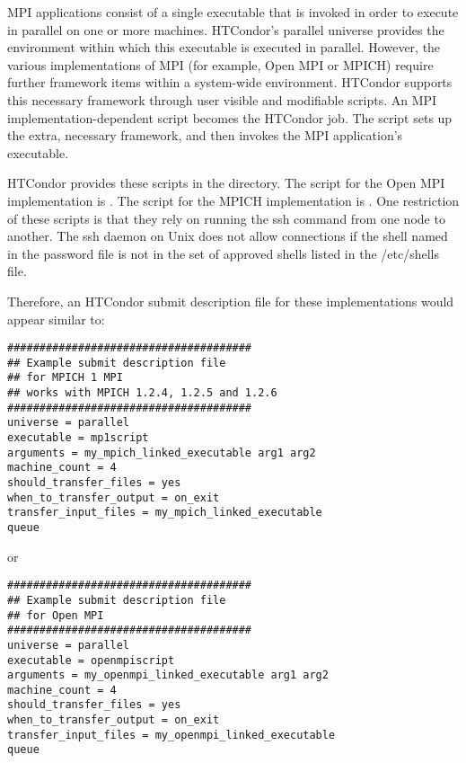 
MPI applications consist of a single executable that is invoked in order to
execute in parallel on one or more machines. 
HTCondor's parallel universe provides the environment within
which this executable is executed in parallel.
However, the various implementations of MPI
(for example, Open MPI or MPICH) require further framework items within
a system-wide environment.
HTCondor supports this necessary framework through 
user visible and modifiable scripts.
An MPI implementation-dependent script becomes the HTCondor job.
The script sets up the extra, necessary framework,
and then invokes the MPI application's executable.

HTCondor provides these scripts in the
directory.
The script for the Open MPI implementation is .
The script for the MPICH implementation is .
One restriction of these scripts is that they rely on running
the ssh command from one node to another.  The ssh daemon 
on Unix does not allow connections if the shell named in
the password file is not in the set of approved shells
listed in the /etc/shells file.

Therefore, an HTCondor submit description file for these
implementations would appear similar to:

\begin{verbatim}
######################################
## Example submit description file
## for MPICH 1 MPI
## works with MPICH 1.2.4, 1.2.5 and 1.2.6
######################################
universe = parallel
executable = mp1script
arguments = my_mpich_linked_executable arg1 arg2
machine_count = 4
should_transfer_files = yes
when_to_transfer_output = on_exit
transfer_input_files = my_mpich_linked_executable
queue
\end{verbatim}

or

\begin{verbatim}
######################################
## Example submit description file
## for Open MPI
######################################
universe = parallel
executable = openmpiscript
arguments = my_openmpi_linked_executable arg1 arg2
machine_count = 4
should_transfer_files = yes
when_to_transfer_output = on_exit
transfer_input_files = my_openmpi_linked_executable
queue
\end{verbatim}

